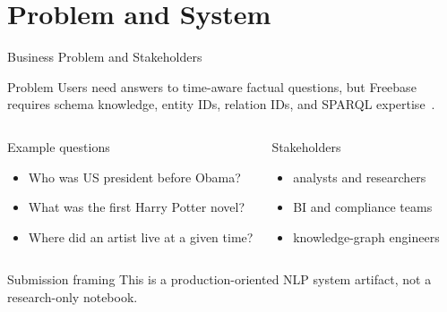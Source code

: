 
\section{Problem and System}

\begin{frame}[shrink=20]{Business Problem and Stakeholders}
  \begin{block}{Problem}
    Users need answers to time-aware factual questions, but Freebase requires schema knowledge, entity IDs, relation IDs, and SPARQL expertise~\parencite{bollacker2008freebase}.
  \end{block}
  \begin{columns}[T]
    \begin{exampleblock}{Example questions}
      \small
      \begin{itemize}
        \item Who was US president before Obama?
        \item What was the first Harry Potter novel?
        \item Where did an artist live at a given time?
      \end{itemize}
    \end{exampleblock}
    \begin{block}{Stakeholders}
      \small
      \begin{itemize}
        \item analysts and researchers
        \item BI and compliance teams
        \item knowledge-graph engineers
      \end{itemize}
    \end{block}
  \end{columns}
  \vspace{0.15cm}
  \begin{alertblock}{Submission framing}
    This is a production-oriented NLP system artifact, not a research-only notebook.
  \end{alertblock}
\end{frame}

